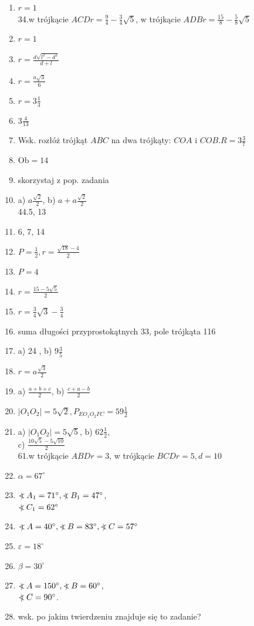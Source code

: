 \documentclass[10pt]{article}
\newcommand\Varangle{\mathop{{<\!\!\!\!\!\text{\small)}}\:}\nolimits}
\begin{document}
\begin{enumerate}
  \item \(r=1\)\\
34.w trójkącie \(A C D r=\frac{9}{4}-\frac{3}{4} \sqrt{5}\), w trójkącie \(A D B r=\frac{15}{8}-\frac{5}{8} \sqrt{5}\)
  \item \(r=1\)
  \item \(r=\frac{d \sqrt{l^{2}-d^{2}}}{d+l}\)
  \item \(r=\frac{a \sqrt{3}}{6}\)
  \item \(r=3 \frac{1}{3}\)
  \item \(3 \frac{4}{13}\)
  \item Wsk. rozłóż trójkąt \(A B C\) na dwa trójkąty: \(C O A\) i \(C O B . R=3 \frac{3}{7}\)
  \item \(\mathrm{Ob}=14\)
  \item skorzystaj z pop. zadania
  \item a) \(a \frac{\sqrt{2}}{2}\), b) \(a+a \frac{\sqrt{2}}{2}\)\\
44.5, 13
  \item 6, 7, 14
  \item \(P=\frac{1}{2}, r=\frac{\sqrt{18}-4}{2}\)
  \item \(P=4\)
  \item \(r=\frac{15-5 \sqrt{5}}{2}\)
  \item \(r=\frac{3}{4} \sqrt{3}-\frac{3}{4}\)
  \item suma długości przyprostokątnych 33, pole trójkąta 116
  \item a) 24 , b) \(9 \frac{3}{5}\)
  \item \(r=a \frac{\sqrt{3}}{2}\)
  \item a) \(\frac{a+b+c}{2}\), b) \(\frac{c+a-b}{2}\)
  \item \(\left|O_{1} O_{2}\right|=5 \sqrt{2}, P_{E O_{1} O_{2} F C}=59 \frac{1}{2}\)
  \item a) \(\left|O_{1} O_{2}\right|=5 \sqrt{5}\), b) \(62 \frac{1}{2}\),\\
c) \(\frac{10 \sqrt{5}-5 \sqrt{10}}{2}\)\\
61.w trójkącie \(A B D r=3\), w trójkącie \(B C D r=5, d=10\)
  \item \(\alpha=67^{\circ}\)
  \item \(\Varangle A_{1}=71^{\circ}, \Varangle B_{1}=47^{\circ}\),\\
\(\Varangle C_{1}=62^{\circ}\)
  \item \(\Varangle A=40^{\circ}, \Varangle B=83^{\circ}, \Varangle C=57^{\circ}\)
  \item \(\varepsilon=18^{\circ}\)
  \item \(\beta=30^{\circ}\)
  \item \(\Varangle A=150^{\circ}, \Varangle B=60^{\circ}\),\\
\(\Varangle C=90^{\circ}\).
  \item wsk. po jakim twierdzeniu znajduje się to zadanie?
\end{enumerate}
\end{document}
